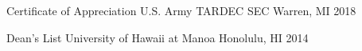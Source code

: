 


\begin{cvhonors}

  \cvhonor
    {Certificate of Appreciation} %
    {U.S. Army TARDEC SEC} %
    {Warren, MI} %
    {2018} %
\end{cvhonors}



\begin{cvhonors}

\cvhonor
    {Dean's List} %
    {University of Hawaii at Manoa} %
    {Honolulu, HI} %
    {2014} %

\end{cvhonors}
